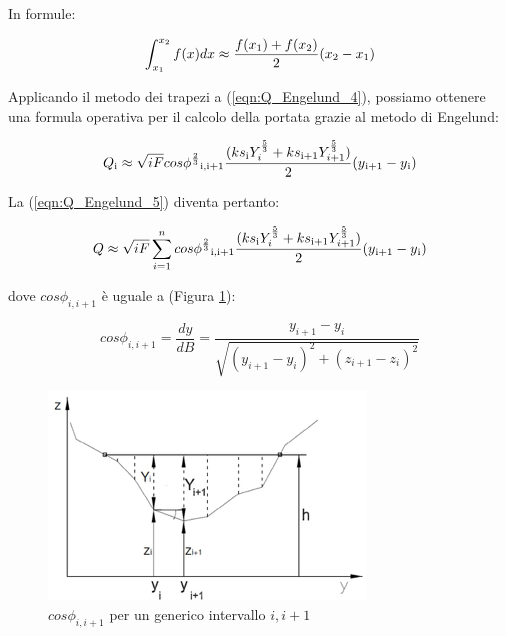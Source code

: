 \documentclass[12pt]{article} %
\begin{document}
\noindent In formule:

\begin{equation}
    \int_{x_1}^{x_2} f(x)dx\approx\frac{f(x\textsubscript{1})+f(x\textsubscript{2})}{2}(x\textsubscript{2}-x\textsubscript{1})
    \label{metodo_trapezi}
\end{equation}

\noindent Applicando il metodo dei trapezi a (\ref{eqn:Q_Engelund_4}), possiamo ottenere una formula operativa per il calcolo della portata grazie al metodo di Engelund:

\begin{equation}
    Q\textsubscript{i}\approx\sqrt{iF}cos\phi^{\frac{2}{3}}\textsubscript{i,i+1}\frac{(ks\textsubscript{i}Y_i^{\frac{5}{3}}+ks\textsubscript{i+1}Y_{i+1}^{\frac{5}{3}})}{2}(y\textsubscript{i+1}-y\textsubscript{i})
    \label{eqn:Q_trapezi_1}
\end{equation}

\noindent La (\ref{eqn:Q_Engelund_5}) diventa pertanto:

\begin{equation}
    Q\approx\sqrt{iF}\sum_{i=1}^n cos\phi^{\frac{2}{3}}\textsubscript{i,i+1}\frac{(ks\textsubscript{i}Y_i^{\frac{5}{3}}+ks\textsubscript{i+1}Y_{i+1}^{\frac{5}{3}})}{2}(y\textsubscript{i+1}-y\textsubscript{i})
    \label{eqn:Q_trapezi_2}
\end{equation}

\noindent dove $cos\phi_{i,i+1}$ è uguale a (Figura \ref{fig:suddivisione_alveo}):

\begin{equation}
    cos\phi_{i,i+1} = \frac{dy}{dB} = \frac{y_{i+1}-y_{i}}{\sqrt{(y_{i+1}-y_{i})^2+(z_{i+1}-z_{i})^2}}
\end{equation}

\begin{figure}
    \centering
    \includegraphics[scale=1.3]{suddivisione alveo.png}
    \caption{$cos\phi_{i,i+1}$ per un generico intervallo $i,i+1$}
    \label{fig:suddivisione_alveo}
\end{figure}
\end{document}
